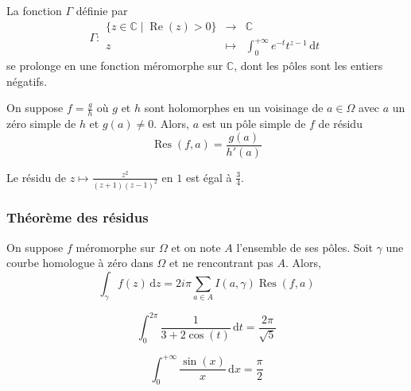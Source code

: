 
  \begin{example}
    La fonction $\Gamma$ définie par
    \[
      \Gamma :
      \begin{array}{ccc}
        \{ z \in \mathbb{C} \mid \operatorname{Re}(z) > 0 \} &\rightarrow& \mathbb{C} \\
        z &\mapsto& \int_{0}^{+\infty} e^{-t} t^{z-1} \, \mathrm{d}t
      \end{array}
    \]
    se prolonge en une fonction méromorphe sur $\mathbb{C}$, dont les pôles sont les entiers négatifs.
  \end{example}


  \begin{proposition}
    On suppose $f = \frac{g}{h}$ où $g$ et $h$ sont holomorphes en un voisinage de $a \in \Omega$ avec $a$ un zéro simple de $h$ et $g(a) \neq 0$. Alors, $a$ est un pôle simple de $f$ de résidu
    \[ \operatorname{Res}(f, a) = \frac{g(a)}{h'(a)} \]
  \end{proposition}

  \begin{example}
    Le résidu de $z \mapsto \frac{z^2}{(z+1)(z-1)^2}$ en $1$ est égal à $\frac{3}{4}$.
  \end{example}

  \subsubsection{Théorème des résidus}

  \begin{theorem}
    On suppose $f$ méromorphe sur $\Omega$ et on note $A$ l'ensemble de ses pôles. Soit $\gamma$ une courbe homologue à zéro dans $\Omega$ et ne rencontrant pas $A$. Alors,
    \[ \int_\gamma f(z) \, \mathrm{d}z = 2i\pi \sum_{a \in A} I(a, \gamma) \operatorname{Res}(f, a) \]
  \end{theorem}


  \begin{example}
    \[ \int_{0}^{2\pi} \frac{1}{3 + 2\cos(t)} \, \mathrm{d}t = \frac{2\pi}{\sqrt{5}} \]
  \end{example}

  \begin{example}
    \[ \int_{0}^{+\infty} \frac{\sin(x)}{x} \, \mathrm{d}x = \frac{\pi}{2} \]
  \end{example}

